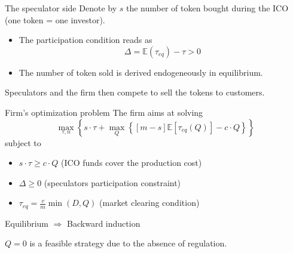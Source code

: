 \documentclass{beamer}
\begin{document}
\begin{frame}{The speculator side}
Denote by $s$ the number of token bought during the ICO (one token = one investor).
\begin{itemize}
  \item The participation condition reads as 
  $$
  \Delta =\mathbb{E}(\tau_{eq})-\tau > 0
  $$
  \item The number of token sold is derived endogeneously in equilibrium.
\end{itemize} 
Speculators and the firm then compete to sell the tokens to customers.
\end{frame}
\begin{frame}{Firm's optimization problem}
The firm aims at solving 
$$
\underset{\tau, n}{\max} \left\{s\cdot \tau + \underset{Q}{\max}\left\{ [m-s]\mathbb{E}[\tau_{eq}(Q)]-c\cdot Q\right\}\right\}
$$
subject to
\begin{itemize}
  \item $s\cdot \tau\geq c\cdot Q$ (ICO funds cover the production cost)
  \item $\Delta\geq0$ (speculators participation constraint)
  \item $\tau_{eq} = \frac{v}{m}\min(D,Q)$ (market clearing condition)
\end{itemize}
Equilibrium $\Rightarrow$ Backward induction
\begin{tcolorbox}[enhanced,drop shadow, title=Moral Hazard ]
  $Q = 0$ is a feasible strategy due to the absence of regulation.
\end{tcolorbox}
\end{frame}
\end{document}
